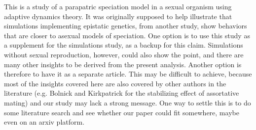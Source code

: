 This is a study of a parapatric speciation model in a sexual organism using adaptive dynamics theory. It was originally supposed to help illustrate that simulations implementing epistatic genetics, from another study, show behaviors that are closer to asexual models of speciation. One option is to use this study as a supplement for the simulations study, as a backup for this claim. Simulations without sexual reproduction, however, could also show the point, and there are many other insights to be derived from the present analysis. Another option is therefore to have it as a separate article. This may be difficult to achieve, because most of the insights covered here are also covered by other authors in the literature (e.g. Bolnick and Kirkpatrick for the stabilizing effect of assortative mating) and our study may lack a strong message. One way to settle this is to do some literature search and see whether our paper could fit somewhere, maybe even on an arxiv platform.